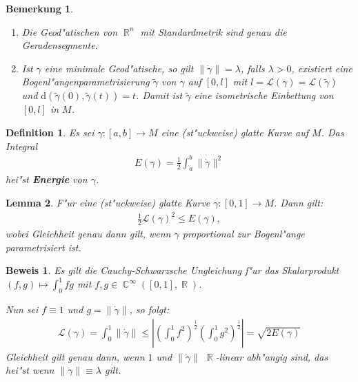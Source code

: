 \documentclass[paper=A4, twoside, chapterprefix=true, bibliography=totoc, headsepline]{scrbook}
\DeclareMathOperator{\C}{\mathbb{C}}
\DeclareMathOperator{\R}{\mathbb{R}}
\newcommand{\dop}{\mathrm{d}}
\theoremstyle{plain}
\newtheorem{Dfn}{Definition}[chapter]
\newtheorem{Lemma}[Dfn]{Lemma}
\theoremstyle{nonumberplain}
\newtheorem{bem}{Bemerkung}
\newtheorem{bew}{Beweis}
\theoremstyle{empty}
\theoremstyle{break}
\newcommand{\CmIndex}[2][]{\ifthenelse{\isempty{#1}}{\index{#2}}{\index{#1}}#2}
\newcommand{\CmMark}[2][]{\textbf{\CmIndex[#1]{#2}}}
\begin{document}

\begin{bem}
  \begin{enumerate}[label=(\arabic*),leftmargin=*]
  \item Die Geod"atischen von $\R^n$ mit Standardmetrik sind genau die Geradensegmente.
  \item Ist $\gamma$ eine minimale Geod"atische, so gilt $\|\dot\gamma\| = \lambda$, falls $\lambda > 0$, existiert eine Bogenl"angenparametrisierung $\tilde\gamma$ von $\gamma$ auf $[0,l]$ mit $l = \mathcal L(\gamma) = \mathcal L(\tilde\gamma)$ und $\dop(\tilde\gamma(0),\tilde\gamma(t)) = t$.
    Damit ist $\tilde\gamma$ eine isometrische Einbettung von $[0,l]$ in $M$.
  \end{enumerate}
\end{bem}

\begin{Dfn}
  Es sei $\gamma \colon [a,b] \to M$ eine (st"uckweise) glatte Kurve auf $M$.
  Das Integral
  \begin{align*}
    E(\gamma) = \frac{1}2 \int_a^b\|\dot\gamma\|^2
  \end{align*}
  hei"st \CmMark{Energie} von $\gamma$.
\end{Dfn}

\begin{Lemma}\label{lemma-6-9}
  F"ur eine (st"uckweise) glatte Kurve $\gamma \colon [0,1] \to M$.
  Dann gilt:
  \begin{align*}
    \frac{1}2 \mathcal L(\gamma)^2 \leq E(\gamma),
  \end{align*}
  wobei Gleichheit genau dann gilt, wenn $\gamma$ proportional zur Bogenl"ange parametrisiert ist.
\end{Lemma}

\begin{bew}
  Es gilt die Cauchy-Schwarzsche Ungleichung f"ur das Skalarprodukt $(f,g) \mapsto \int_0^1 fg$ mit $f,g \in \C^{\infty}([0,1], \R)$.

  Nun sei $f \equiv 1$ und $g = \|\dot\gamma\|$, so folgt:
  \begin{align*}
    \mathcal L(\gamma) = \int_0^1 \|\dot\gamma\| \leq \left|\left(\int_0^1 f^2\right)^{\frac{1}2} \left(\int_0^1g^2\right)^{\frac{1}2}\right| = \sqrt{2 E(\gamma)}
  \end{align*}
  Gleichheit gilt genau dann, wenn $1$ und $\|\dot\gamma\|$ $\R$-linear abh"angig sind, das hei"st wenn $\|\dot\gamma\| \equiv \lambda$ gilt.
\end{bew}
\end{document}

